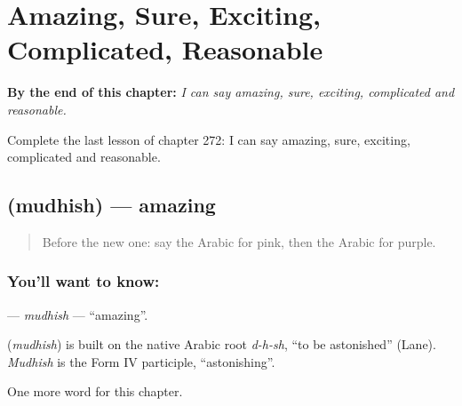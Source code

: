 
\chapter{Amazing, Sure, Exciting, Complicated, Reasonable}
\label{ch:ar-amazing-sure-exciting-complicated-reasonable}

\begin{chapteropening}
\textbf{By the end of this chapter:} \emph{I can say amazing, sure, exciting, complicated and reasonable.}

Complete the last lesson of chapter 272: I can say amazing, sure, exciting, complicated and reasonable.
\end{chapteropening}

\section[\texorpdfstring{\ar{مدهش} (mudhish)}{مدهش (mudhish)}]{ (mudhish) — amazing}

\label{lesson:AR-C272-mudhish}



\begin{quote}
Before the new one: say the Arabic for pink, then the Arabic for purple.
\end{quote}

\subsection*{You'll want to know: }
\textbf{} — \emph{mudhish} — \textquotedblleft{}amazing\textquotedblright{}.

\begin{cousinweb}
\textbf{} (\emph{mudhish}) is built on the native Arabic root \emph{d-h-sh}, \textquotedblleft{}to be astonished\textquotedblright{} (Lane). \emph{Mudhish} is the Form IV participle, \textquotedblleft{}astonishing\textquotedblright{}.
\end{cousinweb}

\begin{grammarlens}[title={What you've built}]
One more word for this chapter.
\end{grammarlens}

